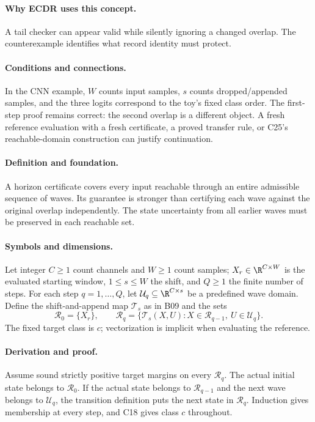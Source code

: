\paragraph{Why ECDR uses this concept.}
A tail checker can appear valid while silently ignoring a changed overlap. The counterexample identifies what record identity must protect.
\paragraph{Conditions and connections.}
In the CNN example, $W$ counts input samples, $s$ counts dropped/appended samples, and the three logits correspond to the toy's fixed class order. The first-step proof remains correct: the second overlap is a different object. A fresh reference evaluation with a fresh certificate, a proved transfer rule, or C25's reachable-domain construction can justify continuation.

\paragraph{Definition and foundation.}
A horizon certificate covers every input reachable through an entire admissible sequence of waves. Its guarantee is stronger than certifying each wave against the original overlap independently. The state uncertainty from all earlier waves must be preserved in each reachable set.
\paragraph{Symbols and dimensions.}
Let integer $C\ge1$ count channels and $W\ge1$ count samples; $X_r\in\R^{C\times W}$ is the evaluated starting window, $1\le s\le W$ the shift, and $Q\ge1$ the finite number of steps. For each step $q=1,\ldots,Q$, let $\mathcal U_q\subseteq\R^{C\times s}$ be a predefined wave domain. Define the shift-and-append map $\mathcal T_s$ as in B09 and the sets
\[
 \mathcal R_0=\{X_r\},\qquad
 \mathcal R_q=\{\mathcal T_s(X,U):X\in\mathcal R_{q-1},\ U\in\mathcal U_q\}.
\]
The fixed target class is $c$; vectorization is implicit when evaluating the reference.
\paragraph{Derivation and proof.}
Assume sound strictly positive target margins on every $\mathcal R_q$. The actual initial state belongs to $\mathcal R_0$. If the actual state belongs to $\mathcal R_{q-1}$ and the next wave belongs to $\mathcal U_q$, the transition definition puts the next state in $\mathcal R_q$. Induction gives membership at every step, and C18 gives class $c$ throughout.

